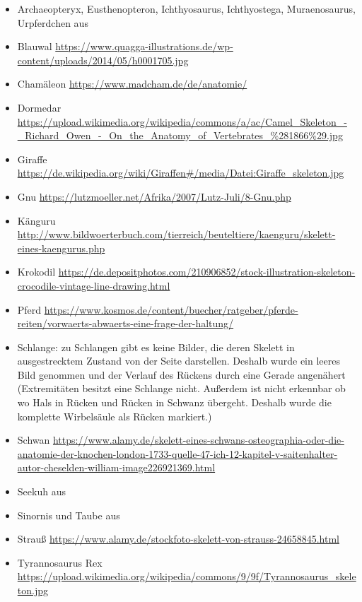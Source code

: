  \begin{itemize}
  \item Archaeopteryx, Eusthenopteron, Ichthyosaurus, Ichthyostega, Muraenosaurus, Urpferdchen aus \cite{Zoologie24Wehner}
  \item Blauwal \url{https://www.quagga-illustrations.de/wp-content/uploads/2014/05/h0001705.jpg}
  \item Chamäleon \url{https://www.madcham.de/de/anatomie/}
  \item Dormedar \url{https://upload.wikimedia.org/wikipedia/commons/a/ac/Camel_Skeleton_-_Richard_Owen_-_On_the_Anatomy_of_Vertebrates_\%281866\%29.jpg}
  \item Giraffe\\ \url{https://de.wikipedia.org/wiki/Giraffen#/media/Datei:Giraffe_skeleton.jpg}
  \item Gnu \url{https://lutzmoeller.net/Afrika/2007/Lutz-Juli/8-Gnu.php}
  \item Känguru \url{http://www.bildwoerterbuch.com/tierreich/beuteltiere/kaenguru/skelett-eines-kaengurus.php}
  \item Krokodil \url{https://de.depositphotos.com/210906852/stock-illustration-skeleton-crocodile-vintage-line-drawing.html}
  \item Pferd \url{https://www.kosmos.de/content/buecher/ratgeber/pferde-reiten/vorwaerts-abwaerts-eine-frage-der-haltung/}
  \item Schlange: zu Schlangen gibt es keine Bilder, die deren Skelett in ausgestrecktem Zustand von der Seite darstellen. Deshalb wurde ein leeres Bild genommen und der Verlauf des Rückens durch eine Gerade angenähert (Extremitäten besitzt eine Schlange nicht. Außerdem ist nicht erkennbar ob \bzw wo Hals in Rücken und Rücken in Schwanz übergeht. Deshalb wurde die komplette Wirbelsäule als Rücken markiert.)
  \item Schwan \url{https://www.alamy.de/skelett-eines-schwans-osteographia-oder-die-anatomie-der-knochen-london-1733-quelle-47-ich-12-kapitel-v-saitenhalter-autor-cheselden-william-image226921369.html}
  \item Seekuh aus \cite{Zoologie25Wehner}
  \item Sinornis und Taube aus \cite{Vergleichende_Anatomie}
  \item Strauß \url{https://www.alamy.de/stockfoto-skelett-von-strauss-24658845.html}
  \item Tyrannosaurus Rex \url{https://upload.wikimedia.org/wikipedia/commons/9/9f/Tyrannosaurus_skeleton.jpg}
 \end{itemize}
 
